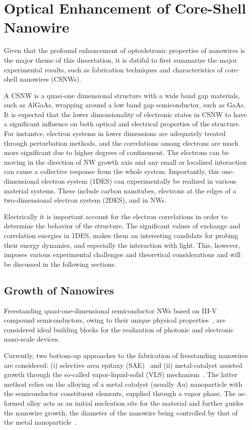 \chapter[Optical Enhancement]{Optical Enhancement of Core-Shell Nanowire}
\label{data}

Given that the profound enhancement of optoeletronic properties of nanowires is
the major theme of this dissertation, it is dutiful to first summarize the
major experimental results, such as fabrication techniques and characteristics of
core-shell nanowires (CSNWs).

A CSNW is a quasi-one dimensional structure with a wide band gap materials,
such as AlGaAs, wrapping around a low band gap semiconductor, such as GaAs. It
is expected that the lower dimensionality of electronic states in CSNW to have
a significant influence on both optical and electrical properties of the
structure. For instantce, electron systems in lower dimensions are adequately
treated through perturbation methods, and the correlations among electrons are
much more significant due to higher degrees of confinement. The electrons can
be moving in the direction of NW growth axis and any small or localized
interaction can cause a collective response from the whole system. Importantly,
this one-dimensional electron system (1DES) can experimentally be realized in
various material systems. These include carbon nanotubes, electrons at the
edges of a two-dimensional electron system (2DES), and in NWs.

Electrically it is important account for the electron correlations in order to
determine the behavior of the structure. The significant values of exchange and
correlation energies in 1DES, makes them an interesting candidate for probing
their energy dynamics, and especially the interaction with light. This,
however, imposes various experimental challenges and theoretical considerations
and will be discussed in the following sections.

\section{Growth of Nanowires}

Freestanding quasi-one-dimensional semiconductor NWs based on III-V compound
semiconductors, owing to their unique physical
properties~\cite{huang2002gallium,Law:2004gl}, are considered ideal building
blocks for the realization of photonic and electronic nano-scale devices.

Currently, two bottom-up approaches to the fabrication of freestanding
nanowires are considered: (i) selective area epitaxy
(SAE)~\cite{motohisa2004catalyst} and (ii) metal-catalyst assisted growth
through the so-called vapor-liquid-solid (VLS) mechanism~\cite{wagner1964vapor,
givargizov1975fundamental}. The latter method relies on the alloying of a metal
catalyst (usually Au) nanoparticle with the semiconductor constituent elements,
supplied through a vapor phase. The as-formed alloy acts as an initial
nucleation site for the material and further guides the nanowire growth, the
diameter of the nanowire being controlled by that of the metal
nanoparticle~\cite{cui2001diameter}.

